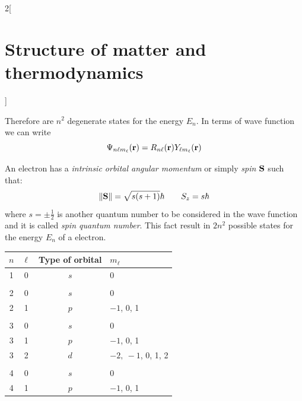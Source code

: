 \documentclass[../../../main.tex]{subfiles}
\begin{document}
\begin{multicols}{2}[\section{Structure of matter and thermodynamics}]
\begin{definition}
\begin{itemize}
        \end{itemize}
        Therefore are $n^2$ degenerate states for the energy $E_n$.
        In terms of wave function we can write $$\Psi_{n\ell m_\ell}(\vb{r})=R_{n\ell}(\vb{r})Y_{\ell m_\ell}(\vb{r})$$
    \end{definition}
    \begin{definition}[Spin]
        An electron has a \textit{intrinsic orbital angular momentum} or simply \textit{spin $\vb{S}$} such that:
        $$\|\vb{S}\|=\sqrt{s(s+1)}\hbar\qquad S_z=s\hbar$$ where $s=\pm\frac{1}{2}$ is another quantum number  to be considered in the wave function and it is called \textit{spin quantum number}. This fact result in $2n^2$ possible states for the energy $E_n$ of a electron.
    \end{definition}
    \begin{center}
        \begin{minipage}{\linewidth}
            \begin{tabular}{cccl}
                \hline
                \hline
                $n$ & $\ell$ & Type of orbital & $m_\ell$                           \\
                \hline
                1   & 0      & $s$             & 0                                  \\
                    &        &                 &                                    \\
                2   & 0      & $s$             & 0                                  \\
                2   & 1      & $p$             & $-1$, 0, 1                         \\
                    &        &                 &                                    \\
                3   & 0      & $s$             & 0                                  \\
                3   & 1      & $p$             & $-1$, 0, 1                         \\
                3   & 2      & $d$             & $-2,\ -1$, 0, 1, 2                 \\
                    &        &                 &                                    \\
                4   & 0      & $s$             & 0                                  \\
                4   & 1      & $p$             & $-1$, 0, 1                         \\

\end{tabular}
\end{minipage}
\end{center}
\end{multicols}
\end{document}
